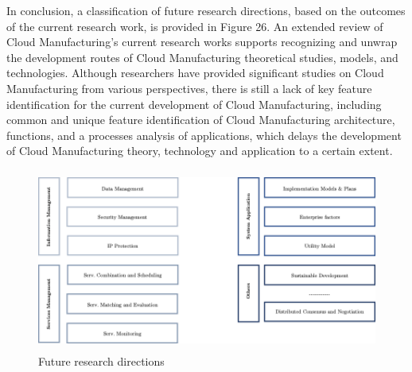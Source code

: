 In conclusion, a classification of future research directions, based on the outcomes of the current research work, is provided in Figure 26. An extended review of Cloud Manufacturing's current research works supports recognizing and unwrap the development routes of Cloud Manufacturing theoretical studies, models, and technologies. Although researchers have provided significant studies on Cloud Manufacturing from various perspectives, there is still a lack of key feature identification for the current development of Cloud Manufacturing, including common and unique feature identification of Cloud Manufacturing architecture, functions, and a processes analysis of applications, which delays the development of Cloud Manufacturing theory, technology and application to a certain extent.
\begin{figure}[h]
    \centering
    \includegraphics[height=6cm, keepaspectratio]{images/future-research-directions}
    \caption{Future research directions}
    \label{fig:future-research-directions}
\end{figure}

